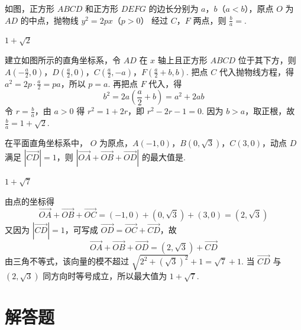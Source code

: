 \begin{problem}
如图，正方形 \(ABCD\) 和正方形 \(DEFG\) 的边长分别为 \(a\)，\(b\)（\(a < b\)），原点 \(O\) 为 \(AD\) 的中点，抛物线 \(y^{2} = 2px \)（\(p > 0\)） 经过 \(C\)，\(F\) 两点，则 \(\frac{b}{a} = \)\fillinblank{}.

\begin{answer}
\(1+\sqrt{2}\)
\end{answer}

\begin{solution}
建立如图所示的直角坐标系，令 \(AD\) 在 \(x\) 轴上且正方形 \(ABCD\) 位于其下方，则
\(A\left(-\frac a2,0\right)\)，\(D\left(\frac a2,0\right)\)，\(C\left(\frac a2,-a\right)\)，\(F\left(\frac a2+b,b\right)\).
把点 \(C\) 代入抛物线方程，得 \(a^2=2p\cdot\frac a2=pa\)，所以 \(p=a\). 再把点 \(F\) 代入，得
\[
b^2=2a\left(\frac a2+b\right)=a^2+2ab
\]
令 \(r=\frac{b}{a}\)，由 \(a>0\) 得 \(r^2=1+2r\)，即 \(r^2-2r-1=0\). 因为 \(b>a\)，取正根，故 \(\frac ba=1+\sqrt2\).
\end{solution}
\end{problem}

\begin{problem}
在平面直角坐标系中， \(O\) 为原点，\(A(-1,0)\)，\(B(0,\sqrt{3})\)，\(C(3,0)\)，动点 \(D\) 满足 \(\left|\overrightarrow{CD}\right| = 1\)，则 \(\left|\overrightarrow{OA} +\overrightarrow{OB} +\overrightarrow{OD}\right|\) 的最大值是\fillinblank{}.
\begin{answer}
\(1+\sqrt{7}\)
\end{answer}

\begin{solution}
由点的坐标得
\[
\overrightarrow{OA}+\overrightarrow{OB}+\overrightarrow{OC}=(-1,0)+(0,\sqrt3)+(3,0)=(2,\sqrt3)
\]
又因为 \(|\overrightarrow{CD}|=1\)，可写成 \(\overrightarrow{OD}=\overrightarrow{OC}+\overrightarrow{CD}\)，故
\[
\overrightarrow{OA}+\overrightarrow{OB}+\overrightarrow{OD}=(2,\sqrt3)+\overrightarrow{CD}
\]
由三角不等式，该向量的模不超过 \(\sqrt{2^2+(\sqrt3)^2}+1=\sqrt7+1\). 当 \(\overrightarrow{CD}\) 与 \((2,\sqrt3)\) 同方向时等号成立，所以最大值为 \(1+\sqrt7\).
\end{solution}
\end{problem}

\section{解答题}

